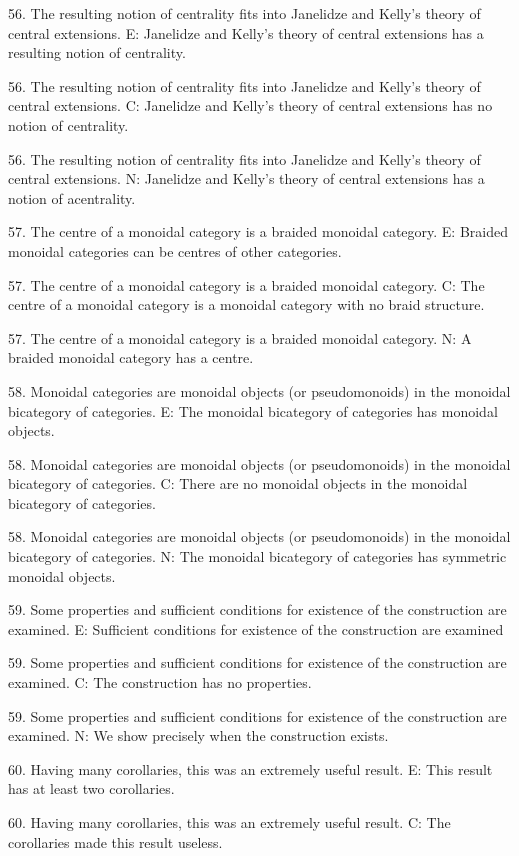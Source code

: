 56. The resulting notion of centrality fits into Janelidze and Kelly's theory of central extensions.
E: Janelidze and Kelly's theory of central extensions has a resulting notion of centrality.

56. The resulting notion of centrality fits into Janelidze and Kelly's theory of central extensions.
C: Janelidze and Kelly's theory of central extensions has no notion of centrality.

56. The resulting notion of centrality fits into Janelidze and Kelly's theory of central extensions.
N: Janelidze and Kelly's theory of central extensions has a notion of acentrality.

57. The centre of a monoidal category is a braided monoidal category.
E: Braided monoidal categories can be centres of other categories.

57. The centre of a monoidal category is a braided monoidal category.
C: The centre of a monoidal category is a monoidal category with no braid structure.

57. The centre of a monoidal category is a braided monoidal category.
N: A braided monoidal category has a centre.

58. Monoidal categories are monoidal objects (or pseudomonoids) in the monoidal bicategory of categories.
E: The monoidal bicategory of categories has monoidal objects.

58. Monoidal categories are monoidal objects (or pseudomonoids) in the monoidal bicategory of categories.
C: There are no monoidal objects in the monoidal bicategory of categories.

58. Monoidal categories are monoidal objects (or pseudomonoids) in the monoidal bicategory of categories.
N: The monoidal bicategory of categories has  symmetric monoidal objects.

59. Some properties and sufficient conditions for existence of the construction are examined.
E: Sufficient conditions for existence of the construction are examined

59. Some properties and sufficient conditions for existence of the construction are examined.
C: The construction has no properties.

59. Some properties and sufficient conditions for existence of the construction are examined.
N: We show precisely when the construction exists.

60. Having many corollaries, this was an extremely useful result.
E: This result has at least two corollaries.

60. Having many corollaries, this was an extremely useful result.
C: The corollaries made this result useless.


